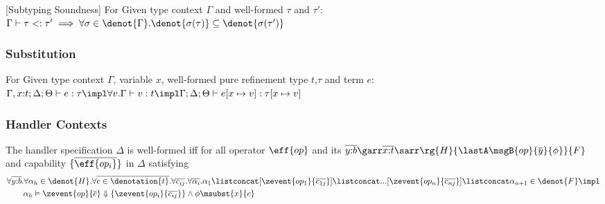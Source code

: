 \begin{lemma}\label{lemma:subtyping}[Subtyping Soundness] For Given type context $\Gamma$ and well-formed \PAT $\tau$ and $\tau'$:
  $\Gamma \vdash \tau <: \tau' \implies \forall \sigma \in \denot{\Gamma}. \denot{\sigma(\tau)} \subseteq \denot{\sigma(\tau')}$
\end{lemma}

\subsubsection{Substitution}

\begin{lemma}\label{lemma:subt} For Given type context $\Gamma$, variable $x$, well-formed pure refinement type $t$,\PAT $\tau$ and term $e$:
  $\Gamma, x{:}t;\Delta;\Theta \vdash e : \tau \impl \forall v. \Gamma \vdash v : t \impl \Gamma;\Delta;\Theta \vdash e[x\mapsto v] : \tau[x\mapsto v]$
\end{lemma}

\subsubsection{Handler Contexts}

\begin{definition}
  \label{lemma:built-in-typing-ap}
  The handler specification $\Delta$ is well-formed iff for all operator $\eff{op}$ and its \PAT $\overline{y{:}b} \garr \overline{x{:}t} \sarr \rg{H}{\lastA\msgB{op}{\overline{y}}{\phi}}{F}$ and capability $\{\overline{\eff{op_i}}\}$ in $\Delta$ satisfying
{\small\begin{align*}
    &\forall \overline{y{:}b}.\forall \alpha_h \in \denot{H}. \forall \overline{c \in \denotation{t}}. \forall \overline{c_{ij}}.\forall \overline{\alpha_i}. \alpha_1 \listconcat [\zevent{op_1}{\overline{c_{1j}}}] \listconcat ... [\zevent{op_n}{\overline{c_{nj}}}] \listconcat \alpha_{n+1} \in \denot{F} \impl
    \\&\qquad \alpha_h \vDash \zevent{op}{\overline{c}} \Downarrow \{\zevent{op_i}{\overline{c_{ij}}}\} \land \phi\msubst{x}{c}
\end{align*}}
\end{definition}

